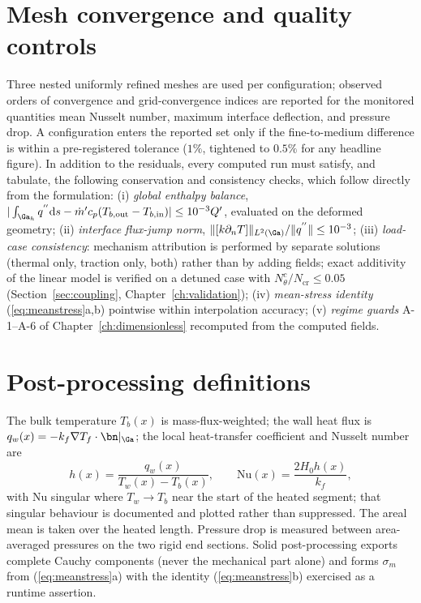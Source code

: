 \section{Mesh convergence and quality controls}
\label{sec:quality}
Three nested uniformly refined meshes are used per configuration; observed orders of convergence
and grid-convergence indices are reported for the monitored quantities mean Nusselt number, maximum
interface deflection, and pressure drop. A configuration enters the reported set only if the
fine-to-medium difference is within a pre-registered tolerance ($1\%$, tightened to $0.5\%$ for any
headline figure). In addition to the residuals, every computed run must satisfy, and tabulate, the
following conservation and consistency checks, which follow directly from the formulation:
(i) \emph{global enthalpy balance},
$|\int_{\Ga_h}q^{''}\mathrm ds-\dot m'c_p(T_{b,\mathrm{out}}-T_{b,\mathrm{in}})|\le10^{-3}Q'$,
evaluated on the deformed geometry;
(ii) \emph{interface flux-jump norm}, $\|[k\partial_nT]\|_{L^2(\Ga)}/\|q^{''}\|\le10^{-3}$;
(iii) \emph{load-case consistency}: mechanism attribution is performed by separate solutions
(thermal only, traction only, both) rather than by adding fields; exact additivity of the linear
model is verified on a detuned case with $N_\theta^c/N_{\mathrm{cr}}\le0.05$
(Section~\ref{sec:coupling}, Chapter~\ref{ch:validation});
(iv) \emph{mean-stress identity} (\ref{eq:meanstress}a,b) pointwise within interpolation accuracy;
(v) \emph{regime guards} A-1--A-6 of Chapter~\ref{ch:dimensionless} recomputed from the computed
fields.

\section{Post-processing definitions}
The bulk temperature $T_b(x)$ is mass-flux-weighted; the wall heat flux is
$q_w(x)=-k_f\nabla T_f\cdot\bn|_\Ga$; the local heat-transfer coefficient and Nusselt number are
\begin{equation}
h(x)=\frac{q_w(x)}{T_w(x)-T_b(x)},\qquad \mathrm{Nu}(x)=\frac{2H_0h(x)}{k_f},
\end{equation}
with $\mathrm{Nu}$ singular where $T_w\to T_b$ near the start of the heated segment; that singular
behaviour is documented and plotted rather than suppressed. The areal mean is taken over the heated
length. Pressure drop is measured between area-averaged pressures on the two rigid end sections.
Solid post-processing exports complete Cauchy components (never the mechanical part alone) and
forms $\sigma_m$ from (\ref{eq:meanstress}a) with the identity (\ref{eq:meanstress}b) exercised as
a runtime assertion.

